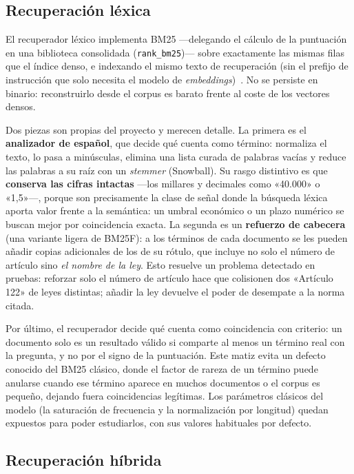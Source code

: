 \subsection{Recuperación léxica}
\label{subsec:recuperacion-lexica}

El recuperador léxico implementa BM25 —delegando el cálculo de la puntuación en una biblioteca consolidada (\texttt{rank\_bm25})— sobre exactamente las mismas filas que el índice denso, e indexando el mismo texto de recuperación (sin el prefijo de instrucción que solo necesita el modelo de \emph{embeddings})~\cite{robertson2009bm25}. No se persiste en binario: reconstruirlo desde el corpus es barato frente al coste de los vectores densos.

Dos piezas son propias del proyecto y merecen detalle. La primera es el \textbf{analizador de español}, que decide qué cuenta como término: normaliza el texto, lo pasa a minúsculas, elimina una lista curada de palabras vacías y reduce las palabras a su raíz con un \emph{stemmer} (Snowball). Su rasgo distintivo es que \textbf{conserva las cifras intactas} —los millares y decimales como «40.000» o «1,5»—, porque son precisamente la clase de señal donde la búsqueda léxica aporta valor frente a la semántica: un umbral económico o un plazo numérico se buscan mejor por coincidencia exacta. La segunda es un \textbf{refuerzo de cabecera} (una variante ligera de BM25F): a los términos de cada documento se les pueden añadir copias adicionales de los de su rótulo, que incluye no solo el número de artículo sino \emph{el nombre de la ley}. Esto resuelve un problema detectado en pruebas: reforzar solo el número de artículo hace que colisionen dos «Artículo 122» de leyes distintas; añadir la ley devuelve el poder de desempate a la norma citada.

Por último, el recuperador decide qué cuenta como coincidencia con criterio: un documento solo es un resultado válido si comparte al menos un término real con la pregunta, y no por el signo de la puntuación. Este matiz evita un defecto conocido del BM25 clásico, donde el factor de rareza de un término puede anularse cuando ese término aparece en muchos documentos o el corpus es pequeño, dejando fuera coincidencias legítimas. Los parámetros clásicos del modelo (la saturación de frecuencia y la normalización por longitud) quedan expuestos para poder estudiarlos, con sus valores habituales por defecto.

\subsection{Recuperación híbrida}
\label{subsec:recuperacion-hibrida}


